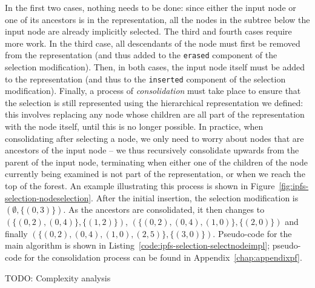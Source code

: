 \noindent In the first two cases, nothing needs to be done: since either the input node or one of its ancestors is in the representation, all the nodes in the subtree below the input node are already implicitly selected. The third and fourth cases require more work. In the third case, all descendants of the node must first be removed from the representation (and thus added to the \texttt{erased} component of the selection modification). Then, in both cases, the input node itself must be added to the representation (and thus to the \texttt{inserted} component of the selection modification). Finally, a process of \emph{consolidation} must take place to ensure that the selection is still represented using the hierarchical representation we defined: this involves replacing any node whose children are all part of the representation with the node itself, until this is no longer possible. In practice, when consolidating after selecting a node, we only need to worry about nodes that are ancestors of the input node -- we thus recursively consolidate upwards from the parent of the input node, terminating when either one of the children of the node currently being examined is not part of the representation, or when we reach the top of the forest. An example illustrating this process is shown in Figure~\ref{fig:ipfs-selection-nodeselection}. After the initial insertion, the selection modification is $(\emptyset,\{(0,3)\})$. As the ancestors are consolidated, it then changes to $(\{(0,2), (0,4)\}, \{(1,2)\})$, $(\{(0,2), (0,4), (1,0)\}, \{(2,0)\})$ and finally $(\{(0,2), (0,4), (1,0), (2,5)\}, \{(3,0)\})$. Pseudo-code for the main algorithm is shown in Listing~\ref{code:ipfs-selection-selectnodeimpl}; pseudo-code for the consolidation process can be found in Appendix~\ref{chap:appendixpf}.

TODO: Complexity analysis

